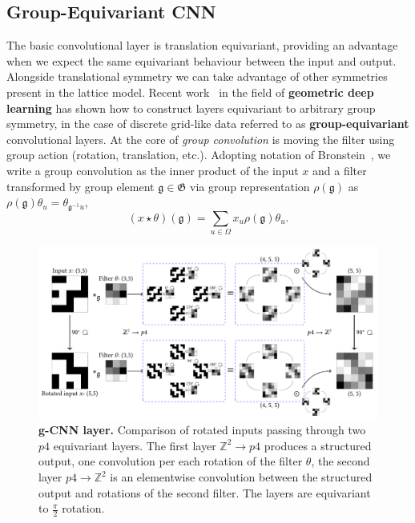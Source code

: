 \subsection{Group-Equivariant CNN}
The basic convolutional layer is translation equivariant, providing an advantage when we expect the same equivariant behaviour between the input and output. Alongside translational symmetry we can take advantage of other symmetries present in the lattice model. Recent work~\cite{cohen2016group, bronstein2021geometric} in the field of \textbf{geometric deep learning} has shown how to construct layers equivariant to arbitrary group symmetry, in the case of discrete grid-like data referred to as \textbf{group-equivariant} convolutional layers. At the core of \emph{group convolution} is moving the filter using group action (rotation, translation, etc.). Adopting notation of Bronstein~\cite{bronstein2021geometric}, we write a group convolution as the inner product of the input $x$ and a filter transformed by group element $\mathfrak{g} \in \mathfrak{G}$ via group representation $\rho(\mathfrak{g})$ as $\rho(\mathfrak{g}) \theta_{u}=\theta_{\mathfrak{g}^{-1} u}$,
\begin{equation}
(x \star \theta)(\mathfrak{g})=\sum_{u \in \Omega} x_{u} \rho(\mathfrak{g}) \theta_{u}.
\end{equation}
\begin{figure}[h]
	\centering
	\includegraphics[width=\linewidth]{Chapter4/Figs/Vector/gcnn}
	\caption[Group-equivariant convolution]{\textbf{g-CNN layer.} Comparison of rotated inputs passing through two $p4$ equivariant layers. The first layer $\mathbb{Z}^2 \rightarrow p4$ produces a structured output, one convolution per each rotation of the filter $\theta$, the second layer $p4 \rightarrow \mathbb{Z}^2$ is an elementwise convolution between the structured output and rotations of the second filter. The layers are equivariant to $\frac{\pi}{2}$ rotation.}
	\label{fig:gcnn}
\end{figure}
